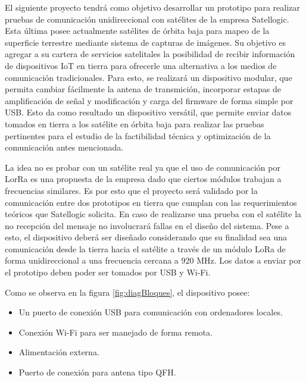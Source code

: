 \documentclass[
11pt, %
codirector, %
]{charter}
\begin{document}
El siguiente proyecto tendrá como objetivo desarrollar un prototipo para realizar pruebas de comunicación unidireccional con satélites de la empresa Satellogic. Esta última posee actualmente satélites de órbita baja para mapeo de la superficie terrestre mediante sistema de capturas de imágenes. Su objetivo es agregar a su cartera de servicios satelitales la posibilidad de recibir información de dispositivos IoT en tierra para ofrecerle una alternativa a los medios de comunicación tradicionales. Para esto, se realizará un dispositivo modular, que permita cambiar fácilmente la antena de transmición, incorporar estapas de amplificación de señal y modificación y carga del firmware de forma simple por USB. Esto da como resultado un dispositivo versátil, que permite enviar datos tomados en tierra a los satélite en órbita baja para realizar las pruebas pertinentes para el estudio de la factibilidad técnica y optimización de la comunicación antes mencionada.

La idea no es probar con un satélite real ya que el uso de comunicación por LorRa es una propuesta de la empresa dado que ciertos módulos trabajan a frecuencias similares. Es por esto que el proyecto será validado por la comunicación entre dos prototipos en tierra que cumplan con las requerimientos teóricos que Satellogic solicita. En caso de realizarse una prueba con el satélite la no recepción del mensaje no involucrará fallas en el diseño del sistema.
Pese a esto, el dispositivo deberá ser diseñado considerando que su finalidad sea una comunicación desde la tierra hacia el satélite a través de un módulo LoRa de forma unidireccional a una frecuencia cercana a 920 MHz. Los datos a enviar por el prototipo deben poder ser tomados por USB y Wi-Fi.


Como se observa en la figura \ref{fig:diagBloques}, el dispositivo posee:
\begin{itemize}
	\item Un puerto de conexión USB para comunicación con ordenadores locales.
	\item Conexión Wi-Fi para ser manejado de forma remota.
	\item Alimentación externa.
	\item Puerto de conexión para antena tipo QFH.
\end{itemize}
\end{document}
